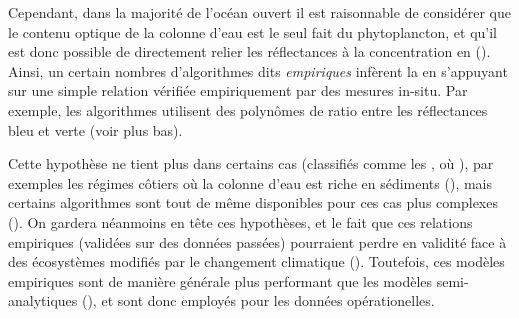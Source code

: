 Cependant, dans la majorité de l'océan ouvert il est raisonnable de considérer que le contenu optique de la colonne d'eau est le seul fait du phytoplancton\footnotemark, et qu'il est donc possible de directement relier les réflectances à la concentration en  (\cite{bailey_2006,brewin_2015a}).
Ainsi, un certain nombres d'algorithmes dits \emph{empiriques} infèrent la  en s'appuyant sur une simple relation vérifiée empiriquement par des mesures in-situ.
Par exemple, les algorithmes  utilisent des polynômes de ratio entre les réflectances bleu et verte (voir plus bas).

Cette hypothèse ne tient plus dans certains cas (classifiés comme les , où ), par exemples les régimes côtiers où la colonne d'eau est riche en sédiments (\cite{bailey_2006,brewin_2015a}), mais certains algorithmes sont tout de même disponibles pour ces cas plus complexes (\cite{gohin_2002}).
On gardera néanmoins en tête ces hypothèses, et le fait que ces relations empiriques (validées sur des données passées) pourraient perdre en validité face à des écosystèmes modifiés par le changement climatique (\cite{dierssen_2010}).
Toutefois, ces modèles empiriques sont de manière générale plus performant que les modèles semi-analytiques (\cite{brewin_2015a}), et sont donc employés pour les données opérationelles.

